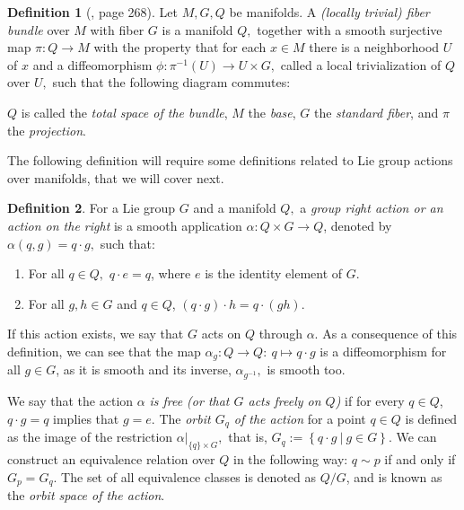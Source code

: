 \documentclass[12pt, letterpaper, reqno]{amsart}
\theoremstyle{definition}
\newtheorem{df}{Definition}
\theoremstyle{plain}
\theoremstyle{remark}
\begin{document}
\begin{df}[\cite{lee2003introduction}, page 268]
	Let $ M, G, Q $ be manifolds. A \textit{(locally trivial) fiber bundle} over $ M $ with fiber $ G $ is a manifold $ Q, $ together with a smooth surjective map $ \pi: Q \rightarrow {M}
$ with the property that for each $ x\in M $ there is a neighborhood $ U $ of $ x $ and a diffeomorphism $ \phi:\pi^{-1}(U) \rightarrow {U\times G,}
 $ called a local trivialization of $ Q $ over $ U, $ such that the following diagram commutes:
 \begin{center}
 \end{center}
 $ Q $ is called the \textit{total space of the bundle}, $ M $ the \textit{base}, $ G $ the \textit{standard fiber},  and $ \pi $ the \textit{projection}.   
\end{df}

The following definition will require some definitions related to Lie group actions over manifolds, that we will cover next. 

\begin{df}
For a Lie group $ G $ and a manifold $ Q, $ a \textit{group right action or an action on the right} is a smooth application $ \alpha:  Q\times G \rightarrow Q $, denoted by $ \alpha(q,g) = q \cdot g, $ such that:

\begin{enumerate}
	\item For all $ q\in Q, $ $ q\cdot e = q $, where $ e $ is the identity element of $ G. $   
	\item For all $ g,h\in G $ and $ q\in Q $, $ (q\cdot g) \cdot h =q\cdot(gh). $ 
\end{enumerate}

\end{df}
If this action exists, we say that $ G $ acts on $ Q $ through $ \alpha. $ As a consequence of this definition, we can see that the map $ \alpha_g: Q \rightarrow Q: \ q\mapsto q\cdot g$ is a diffeomorphism for all $ g\in G $, as it is smooth and its inverse, $ \alpha_{g^{-1}}, $ is smooth too.

We say that the action $ \alpha $ \textit{is free (or that $ G $ acts freely on $ Q $)} if for every $ q\in Q $, $ q\cdot g =q$   implies that $ g=e. $ The \textit{orbit $ G_q $ of the action}  for a point $ q\in Q $  is defined as the image of the restriction $\alpha|_{\{q\}\times G},$  that is, $ G_q := \left\{q\cdot g \ | \ g\in G \right\}. $ We can construct an equivalence relation over $ Q $ in the following way: $ q\sim p $ if and only if $ G_p = G_q $. The set of all equivalence classes is denoted as $ Q/G $, and is known as the \textit{orbit space of the action}.     
\end{document}
